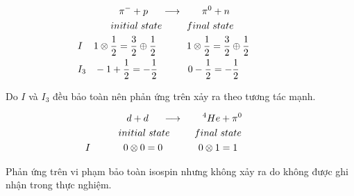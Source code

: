 \documentclass{report}
\begin{document}
	\begin{align*}
		& \hspace*{0.3cm} \pi^{-} + p \hspace*{0.5cm} \longrightarrow \hspace*{0.7cm} \pi^{0} + n \\
		& initial \hspace*{0.1cm} state \hspace*{0.9cm} final \hspace*{0.1cm} state \\
		& \hspace*{-1.2cm} I \hspace*{0.4cm} 1 \otimes  \frac{1}{2} = \frac{3}{2} \oplus \frac{1}{2} \hspace*{1.1cm} 1 \otimes  \frac{1}{2} = \frac{3}{2} \oplus \frac{1}{2} \\
		& \hspace*{-1.2cm} I_{3} \hspace*{0.3cm} -1 + \frac{1}{2} = -\frac{1}{2} \hspace*{1.1cm} 0 - \frac{1}{2} = - \frac{1}{2}
	\end{align*}
	
Do \(I\) và \(I_{3}\) đều bảo toàn nên phản ứng trên xảy ra theo tương tác mạnh.

	\begin{align*}
		& \hspace*{0.3cm} d + d \hspace*{0.5cm} \longrightarrow \hspace*{0.7cm}^{4} He + \pi^{0} \\
		& initial \hspace*{0.1cm} state \hspace*{0.9cm} final \hspace*{0.1cm} state \\
		& \hspace*{-1.2cm} I \hspace*{1.2cm} 0 \otimes 0 = 0 \hspace*{1.3cm} 0 \otimes 1 = 1 \\
	\end{align*}

Phản ứng trên vi phạm bảo toàn isospin nhưng không xảy ra do không được ghi nhận trong thực nghiệm.
\end{document}
